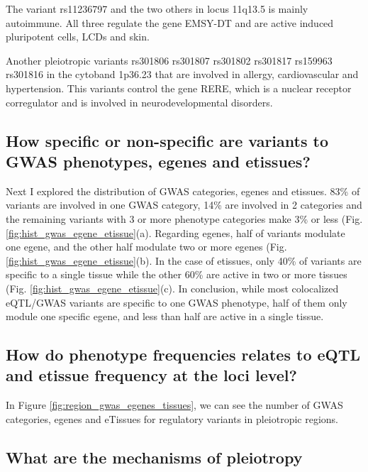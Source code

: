 The variant rs11236797 and the two others in locus 11q13.5 is mainly autoimmune.
All three regulate the gene EMSY-DT and are active induced pluripotent cells, LCDs and skin.

Another pleiotropic variants rs301806
rs301807
rs301802
rs301817
rs159963
rs301816
in the cytoband 1p36.23 that are involved in allergy, cardiovascular and hypertension.
This variants control the gene RERE, which is a nuclear receptor corregulator and is involved in neurodevelopmental disorders.\\

\subsection*{How specific or non-specific are variants to GWAS phenotypes, egenes and etissues?}

Next I explored the distribution of GWAS categories, egenes and etissues.
%
83\% of variants are involved in one GWAS category, 14\% are involved in 2 categories and the remaining variants with 3 or more phenotype categories make 3\% or less (Fig. \ref{fig:hist_gwas_egene_etissue}(a).
%
Regarding egenes, half of variants modulate one egene, and the other half modulate two or more egenes (Fig. \ref{fig:hist_gwas_egene_etissue}(b).
%
In the case of etissues, only 40\% of variants are specific to a single tissue while the other 60\% are active in two or more tissues (Fig. \ref{fig:hist_gwas_egene_etissue}(c).
%
In conclusion, while most colocalized eQTL/GWAS variants are specific to one GWAS phenotype, half of them only module one specific egene, and less than half are active in a single tissue.

\subsection*{How do phenotype frequencies relates to eQTL and etissue frequency at the loci level?}


In Figure \ref{fig:region_gwas_egenes_tissues}, we can see the number of GWAS categories, egenes and eTissues for regulatory variants in pleiotropic regions.

\subsection*{What are the mechanisms of pleiotropy}

